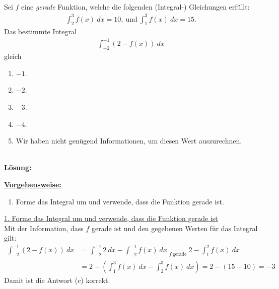 \subsection*{}
Sei $ f $ eine \textit{gerade} Funktion, welche die folgenden (Integral-) Gleichungen erfüllt:
\begin{align*}
	\int_{2}^3 f(x) \ dx = 10, \ \textrm{und} \
	\int_1^3 f(x) \ dx = 15.
\end{align*}
Das bestimmte Integral
\begin{align*}
	\int_{-2}^{-1} (2 - f(x) ) \ dx
\end{align*}  
gleich
\renewcommand{\labelenumi}{(\alph{enumi})}
\begin{enumerate}
	\item 
	$ -1 $.
	\item
	$ -2 $.
	\item
	$ -3 $.
	\item
	$ -4 $.
	\item
	Wir haben nicht genügend Informationen, um diesen Wert auszurechnen.
\end{enumerate}
\ \\
\textbf{Lösung:}
\begin{mdframed}
\underline{\textbf{Vorgehensweise:}}
\renewcommand{\labelenumi}{\theenumi.}
\begin{enumerate}
\item Forme das Integral um und verwende, dass die Funktion gerade ist.
\end{enumerate}
\end{mdframed}

\underline{1. Forme das Integral um und verwende, dass die Funktion gerade ist}\\
Mit der Information, dass $f$ gerade ist und den gegebenen Werten für das Integral gilt:
\begin{align*}
	\int_{-2}^{-1} (2 - f(x) ) \ dx
	&=
	\int_{-2}^{-1} 2  \ dx
	-
	\int_{-2}^{-1} f(x) \ dx
	\underset{f \ \text{gerade}}{=}
	2
	-
	\int_{1}^{2} f(x) \ dx\\
	&=
	2 
	-
	\left(\int_{1}^{3} f(x) \ dx - \int_{2}^{3} f(x) \ dx\right)
	=
	2
	-
	(15 - 10)
	=-3
\end{align*}
Damit ist die Antwort (c) korrekt.

\newpage
